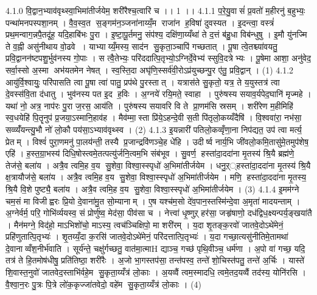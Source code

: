 4.1.0
वि॒द्वान॒भ्याव॑वृथ्स्वा॒भिमा॑तीर्जयेम॒ शरी॑रैश्च॒त्वारि॑ च ।। 1 ।।
4.1.1
प॒रे॒यु॒वासं॑ प्र॒वतो॑ म॒हीरनु॑ ब॒हुभ्यः॒ पन्था॑मनपस्पशा॒नम् । वै॒व॒स्व॒त स॒ङ्गम॑न॒ञ्जना॑नाय्यँ॒म राजा॑न ह॒विषा॑ दुवस्यत । इ॒दन्त्वा॒ वस्त्रं॑ प्रथ॒मन्वाग॒न्नपै॒तदू॑ह॒ यदि॒हाबि॑भः पु॒रा । इ॒ष्टा॒पू॒र्तमनु॒ संप॑श्य॒ दक्षि॑णा॒य्यँथा॑ ते द॒त्तं ब॑हु॒धा विब॑न्धुषु । इ॒मौ यु॑नज्मि ते व॒ह्नी असु॑नीथाय वो॒ढवे । याभ्याय्यँ॒मस्य॒ साद॑न सु॒कृता॒ञ्चापि॑ गच्छतात् । पू॒षा त्वे॒तश्च्या॑वयतु॒ प्रवि॒द्वानन॑ष्टपशु॒र्भुव॑नस्य गो॒पाः । स त्वै॒तेभ्यः॒ परि॑ददात्पि॒तृभ्यो॒ऽग्निर्दे॒वेभ्य॑ स्सुवि॒दत्रेभ्यः । पू॒षेमा आशा॒ अनु॑वेद॒ सर्वा॒स्सो अ॒स्मा अभ॑यतमेन नेषत् । स्व॒स्ति॒दा अघृ॑णि॒स्सर्व॑वी॒रोऽप्र॑युच्छन्पु॒र ए॑तु॒ प्रवि॒द्वान् । (1)
4.1.2
आयु॑र्वि॒श्वायुः॒ परि॑पासति त्वा पू॒षा त्वा॑ पातु॒ प्रप॑थे पु॒रस्तात् । यत्रास॑ते सु॒कृतो॒ यत्र॒ ते य॒युस्तत्र॑ त्वा दे॒वस्स॑वि॒ता द॑धातु । भुव॑नस्य पत इ॒द ह॒विः । अ॒ग्नये॑ रयि॒मते॒ स्वाहा । पुरु॑षस्य सयाव॒र्यपेद॒घानि॑ मृज्महे । यथा॑ नो॒ अत्र॒ नाप॑रः पु॒रा ज॒रस॒ आय॑ति । पुरु॑षस्य सयावरि वि ते प्रा॒णम॑सि स्रसम् । शरी॑रेण म॒हीमिहि॑ स्व॒धयेहि॑ पि॒तॄनुप॑ प्र॒जया॒ऽस्मानि॒हाव॑ह । मैव॑म्मा॒स्ता प्रि॑ये॒ऽहन्दे॒वी स॒ती पि॑तृलो॒कय्यँदैषि॑ । वि॒श्ववा॑रा॒ नभ॑सा॒ सव्व्यँ॑यन्त्यु॒भौ नो॑ लो॒कौ पय॑सा॒ऽभ्याव॑वृथ्स्व । (2)
4.1.3
इ॒यन्नारी॑ पतिलो॒कव्वृँणा॒ना निप॑द्यत॒ उप॑ त्वा मर्त्य॒ प्रेतम् । विश्वं॑ पुरा॒णमनु॑ पा॒लय॑न्ती॒ तस्यै प्र॒जान्द्रवि॑णञ्चे॒ह धे॑हि । उदीर्ष्व नार्य॒भि जी॑वलो॒कमि॒तासु॑मे॒तमुप॑शेष॒ एहि॑ । ह॒स्त॒ग्रा॒भस्य॑ दिधि॒षोस्त्वमे॒तत्पत्यु॑र्जनि॒त्वम॒भि संब॑भूव । सु॒वर्ण॒ हस्ता॑दा॒ददा॑ना मृ॒तस्य॑ श्रि॒यै ब्रह्म॑णे॒ तेज॑से॒ बला॑य । अत्रै॒व त्वमि॒ह व॒य सु॒शेवा॒ विश्वा॒स्स्पृधो॑ अ॒भिमा॑तीर्जयेम । धनु॒ऱ््हस्ता॑दा॒ददा॑ना मृ॒तस्य॑ श्रि॒यै क्ष॒त्रायौज॑से॒ बला॑य । अत्रै॒व त्वमि॒ह व॒य सु॒शेवा॒ विश्वा॒स्स्पृधो॑ अ॒भिमा॑तीर्जयेम । मणि॒ हस्ता॑दा॒ददा॑ना मृ॒तस्य॒ श्रि॒यै वि॒शे पुष्ट्यै॒ बला॑य । अत्रै॒व त्वमि॒ह व॒य सु॒शेवा॒ विश्वा॒स्स्पृधो॑ अ॒भिमा॑तीर्जयेम । (3)
4.1.4
इ॒मम॑ग्ने चम॒सं मा विजीह्वरः प्रि॒यो दे॒वाना॑मु॒त सो॒म्यानाम् । ए॒ष यश्च॑म॒सो दे॑व॒पान॒स्तस्मि॑न्दे॒वा अ॒मृता॑ मादयन्ताम् । अ॒ग्नेर्वर्म॒ परि॒ गोभि॑र्व्ययस्व॒ सं प्रोर्णु॑ष्व॒ मेद॑सा॒ पीव॑सा च । नेत्त्वा॑ धृ॒ष्णुऱ् हर॑सा॒ जऱ्हृ॑षाणो॒ दध॑द्विध॒क्ष्यन्पर्य॒ङ्खया॑तै । मैन॑मग्ने॒ विद॑हो॒ माऽभिशो॑चो॒ माऽस्य॒ त्वच॑ञ्चिक्षिपो॒ मा शरी॑रम् । य॒दा शृ॒तङ्क॒रवो॑ जातवे॒दोऽथे॑मेनं॒ प्रहि॑णुतात्पि॒तृभ्यः॑ । शृ॒तय्यँ॒दा क॒रसि॑ जातवे॒दोऽथे॑मेनं॒ परि॑दत्तात्पि॒तृभ्यः॑ । य॒दा गच्छा॒त्यसु॑नीतिमे॒तामथा॑ दे॒वानाव्वँश॒नीर्भ॑वाति । सूर्य॑न्ते॒ चक्षु॑र्गच्छतु॒ वात॑मा॒त्माH द्याञ्च॒ गच्छ॑ पृथि॒वीञ्च॒ धर्म॑णा । अ॒पो वा॑ गच्छ॒ यदि॒ तत्र॑ ते हि॒तमोष॑धीषु॒ प्रति॑तिष्ठा॒ शरी॑रैः । अ॒जो भा॒गस्तप॑सा॒ तन्त॑पस्व॒ तन्ते॑ शो॒चिस्त॑पतु॒ तन्ते॑ अ॒र्चिः । यास्ते॑ शि॒वास्त॒नुवो॑ जातवेद॒स्ताभि॑र्वहे॒म सु॒कृता॒य्यँत्र॑ लो॒काः । अ॒यव्वैं त्वम॒स्मादधि॒ त्वमे॒तद॒यव्वैं तद॑स्य॒ योनि॑रसि । वै॒श्वा॒न॒रः पु॒त्रः पि॒त्रे लो॑क॒कृज्जा॑तवेदो॒ वहे॑म सु॒कृता॒य्यँत्र॑ लो॒काः । (4)
\anuvakamend


